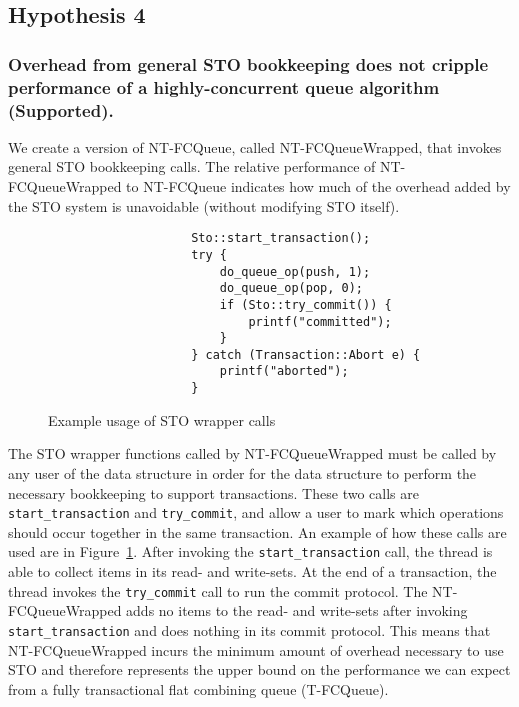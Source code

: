 \subsection{Hypothesis 4}
\subsubsection{Overhead from general STO bookkeeping does not cripple performance of a highly-concurrent queue algorithm (Supported).}

We create a version of NT-FCQueue, called NT-FCQueueWrapped, that invokes general STO bookkeeping calls. The relative performance of NT-FCQueueWrapped to NT-FCQueue indicates how much of the overhead added by the STO system is unavoidable (without modifying STO itself). 

\begin{figure}[t!]
\centering
\singlespace
{}
	\begin{lstlisting}
                    Sto::start_transaction();
                    try {
                        do_queue_op(push, 1);
                        do_queue_op(pop, 0);
                        if (Sto::try_commit()) {
                            printf("committed");
                        }
                    } catch (Transaction::Abort e) {
                        printf("aborted");
                    }
	\end{lstlisting}
\caption{Example usage of STO wrapper calls}
\label{fig:wrappers}
\end{figure}
The STO wrapper functions called by NT-FCQueueWrapped must be called by any user of the data structure in order for the data structure to perform the necessary bookkeeping to support transactions.
These two calls are \texttt{start\_transaction} and \texttt{try\_commit}, and allow a user to mark which operations should occur together in the same transaction. An example of how these calls are used are in Figure~\ref{fig:wrappers}. After invoking the \texttt{start\_transaction} call, the thread is able to collect items in its read- and write-sets. At the end of a transaction, the thread invokes the \texttt{try\_commit} call to run the commit protocol. The NT-FCQueueWrapped adds no items to the read- and write-sets after invoking \texttt{start\_transaction} and does nothing in its commit protocol. This means that NT-FCQueueWrapped incurs the minimum amount of overhead necessary to use STO and therefore represents the upper bound on the performance we can expect from a fully transactional flat combining queue (T-FCQueue). 

